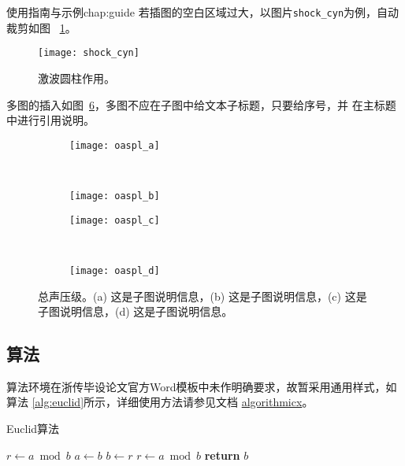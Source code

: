 \begin{cuzchapter}{使用指南与示例}{chap:guide}
	若插图的空白区域过大，以图片\verb|shock_cyn|为例，自动裁剪如图
	~\ref{fig:shock_cyn}。
	\begin{figure}[h]
		\centering
		\texttt{[image: shock\_cyn]}
		\caption[激波圆柱作用]{激波圆柱作用。}
		\label{fig:shock_cyn}
	\end{figure}

	多图的插入如图~\ref{fig:oaspl}，多图不应在子图中给文本子标题，只要给序号，并
	在主标题中进行引用说明。
	\begin{figure}[h]
		\centering
		\begin{subfigure}[b]{0.35\textwidth}
			\texttt{[image: oaspl\_a]}
			\caption{}
			\label{fig:oaspl_a}
		\end{subfigure}%
		~%
		\begin{subfigure}[b]{0.35\textwidth}
			\texttt{[image: oaspl\_b]}
			\caption{}
			\label{fig:oaspl_b}
		\end{subfigure}
		\begin{subfigure}[b]{0.35\textwidth}
			\texttt{[image: oaspl\_c]}
			\caption{}
			\label{fig:oaspl_c}
		\end{subfigure}%
		~%
		\begin{subfigure}[b]{0.35\textwidth}
			\texttt{[image: oaspl\_d]}
			\caption{}
			\label{fig:oaspl_d}
		\end{subfigure}
		\caption[总声压级]{总声压级。(a) 这是子图说明信息，(b) 这是子图说明信息，(c) 这是子图说明信息，(d) 这是子图说明信息。}
		\label{fig:oaspl}
	\end{figure}

	\subsection{算法}\label{sub:algorithms}

	算法环境在浙传毕设论文官方Word模板中未作明确要求，故暂采用通用样式，如算法
	\ref{alg:euclid}所示，详细使用方法请参见文档
	\href{https://ctan.org/pkg/algorithmicx?lang=en}{algorithmicx}。

	\begin{algorithm}[h]
		\small
		\caption{Euclid算法}\label{alg:euclid}
		\begin{algorithmic}[1]
			\State $r\gets a\bmod b$
			\State $a\gets b$
			\State $b\gets r$
			\State $r\gets a\bmod b$
			\EndWhile\label{euclidendwhile}
			\State \textbf{return} $b$
			\EndProcedure
		\end{algorithmic}
	\end{algorithm}


\end{cuzchapter}
